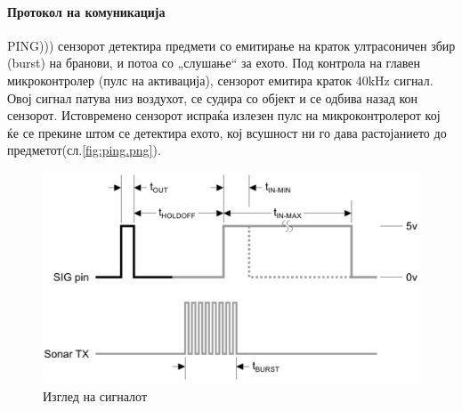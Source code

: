 \documentclass[12pt]{article}
\begin{document}
		  \paragraph{Протокол на комуникација\\}
        PING))) сензорот детектира предмети со емитирање на краток ултрасоничен збир (burst) на бранови, и потоа со „слушање“ за ехото. Под контрола на главен микроконтролер (пулс на активација), сензорот емитира краток 40kHz сигнал. Овој сигнал патува низ воздухот, се судира со објект и се одбива назад кон сензорот. Истовремено сензорот испраќа излезен пулс на микроконтролерот кој ќе се прекине штом се детектира ехото, кој всушност ни го дава растојанието до предметот(сл.\ref{fig:ping.png}).

      \begin{figure}[H]
        \includegraphics[width=0.75\linewidth]{./images/ping_sig.png}
        \centering
        \caption{Изглед на сигналот}
        \label{fig:ping_sig.png}
        \end{figure}

      \begin{table}[H]
        \caption{Карактеристики на сигналот}
        \label{tab:signalchar}
        \begin{center}
          \end{center}
				\end{table}
\end{document}
